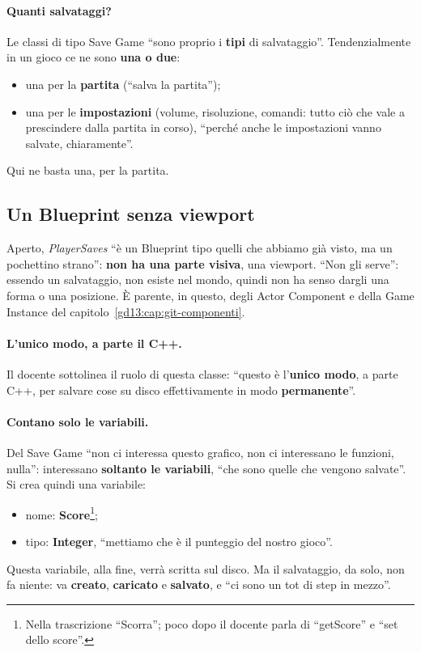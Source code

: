 \paragraph{Quanti salvataggi?} Le classi di tipo Save Game ``sono proprio i
\textbf{tipi} di salvataggio''. Tendenzialmente in un gioco ce ne sono
\textbf{una o due}:
\begin{itemize}
  \item una per la \textbf{partita} (``salva la partita'');
  \item una per le \textbf{impostazioni} (volume, risoluzione, comandi: tutto
        ciò che vale a prescindere dalla partita in corso), ``perché anche le
        impostazioni vanno salvate, chiaramente''.
\end{itemize}
Qui ne basta una, per la partita.

\subsection{Un Blueprint senza viewport}

Aperto, \emph{PlayerSaves} ``è un Blueprint tipo quelli che abbiamo già visto, ma
un pochettino strano'': \textbf{non ha una parte visiva}, una viewport.
``Non gli serve'': essendo un salvataggio, non esiste nel mondo, quindi non ha
senso dargli una forma o una posizione. È parente, in questo, degli Actor
Component e della Game Instance del capitolo~\ref{gd13:cap:git-componenti}.

\paragraph{L'unico modo, a parte il C++.} Il docente sottolinea il ruolo di
questa classe: ``questo è l'\textbf{unico modo}, a parte C++, per salvare cose
su disco effettivamente in modo \textbf{permanente}''.

\paragraph{Contano solo le variabili.} Del Save Game ``non ci interessa questo
grafico, non ci interessano le funzioni, nulla'': interessano \textbf{soltanto
le variabili}, ``che sono quelle che vengono salvate''. Si crea quindi una
variabile:
\begin{itemize}
  \item nome: \textbf{Score}\footnote{Nella trascrizione ``Scorra''; poco dopo il
        docente parla di ``getScore'' e ``set dello score''.};
  \item tipo: \textbf{Integer}, ``mettiamo che è il punteggio del nostro gioco''.
\end{itemize}
Questa variabile, alla fine, verrà scritta sul disco. Ma il salvataggio, da
solo, non fa niente: va \textbf{creato}, \textbf{caricato} e
\textbf{salvato}, e ``ci sono un tot di step in mezzo''.

